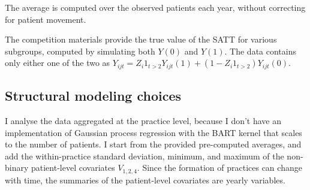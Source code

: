 \documentclass[a4paper]{article}
\theoremstyle{definition}
\begin{document}
    The average is computed over the observed patients each year, without correcting for patient movement.

    The competition materials provide the true value of the SATT for various subgroups, computed by simulating both $Y(0)$ and $Y(1)$. The data contains only either one of the two as $Y_{ijt} = Z_i 1_{t>2} Y_{ijt}(1) + (1 - Z_i1_{t>2}) Y_{ijt}(0)$.
    
    \subsection{Structural modeling choices}

    I analyse the data aggregated at the practice level, because I don't have an implementation of Gaussian process regression with the BART kernel that scales to the number of patients. I start from the provided pre-computed averages, and add the within-practice standard deviation, minimum, and maximum of the non-binary patient-level covariates $V_{1,2,4}$. Since the formation of practices can change with time, the summaries of the patient-level covariates are yearly variables.
\end{document}
